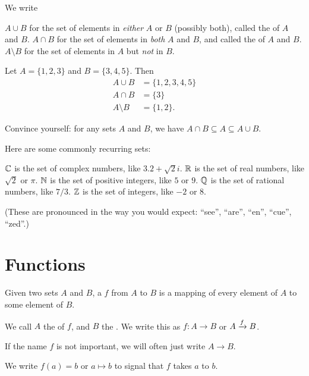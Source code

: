 \begin{definition}
	We write
	\begin{itemize}
		\ii $A \cup B$ for the set of elements in
		\emph{either} $A$ or $B$ (possibly both),
		called the  of $A$ and $B$.
		\ii $A \cap B$ for the set of elements in \emph{both} $A$ and $B$, and
		called the  of $A$ and $B$.
		\ii $A \setminus B$ for the set of elements in $A$ but \emph{not} in $B$.
	\end{itemize}
\end{definition}

\begin{example}
	Let $A = \{1,2,3\}$ and $B = \{3,4,5\}$. Then
	\begin{align*}
		A \cup B &= \{1,2,3,4,5\} \\
		A \cap B &= \{3\} \\
		A \setminus B &= \{1,2\}.
	\end{align*}
\end{example}

\begin{exercise}
	Convince yourself: for any sets $A$ and $B$,
	we have $A \cap B \subseteq A \subseteq A \cup B$.
\end{exercise}

Here are some commonly recurring sets:
\begin{itemize}
	\ii $\mathbb C$ is the set of complex numbers, like $3.2 + \sqrt 2 i$.
	\ii $\mathbb R$ is the set of real numbers, like $\sqrt 2$ or $\pi$.
	\ii $\mathbb N$ is the set of positive integers, like $5$ or $9$.
	\ii $\mathbb Q$ is the set of rational numbers, like $7/3$.
	\ii $\mathbb Z$ is the set of integers, like $-2$ or $8$.
\end{itemize}
(These are pronounced in the way you would expect:
``see'', ``are'', ``en'', ``cue'', ``zed''.)

\section{Functions}
Given two sets $A$ and $B$, a  $f$ from $A$ to $B$
is a mapping of every element of $A$ to some element of $B$.

We call $A$ the  of $f$, and $B$ the .
We write this as $f \colon A \to B$ or $A \xrightarrow{f} B$.
\begin{abuse}
	If the name $f$ is not important, we will often just write $A \to B$.
\end{abuse}
We write $f(a) = b$ or $a \mapsto b$ to signal that $f$ takes $a$ to $b$.

